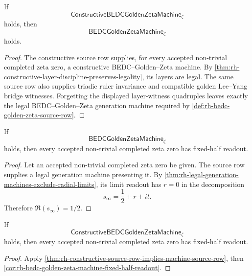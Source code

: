 \begin{theorem}
\label{thm:rh-constructive-source-row-implies-machine-source-row}
If
$$
\mathsf{ConstructiveBEDCGoldenZetaMachine}_{\zeta}
$$
holds, then
$$
\mathsf{BEDCGoldenZetaMachine}_{\zeta}
$$
holds.
\end{theorem}

\begin{proof}
The constructive source row supplies, for every accepted non-trivial
completed zeta zero, a constructive BEDC--Golden--Zeta machine.  By
\autoref{thm:rh-constructive-layer-discipline-preserves-legality}, its
layers are legal.  The same source row also supplies triadic ruler
invariance and compatible golden Lee--Yang bridge witnesses.  Forgetting
the displayed layer-witness quadruples leaves exactly the legal
BEDC--Golden--Zeta generation machine required by
\autoref{def:rh-bedc-golden-zeta-source-row}.
\end{proof}

\begin{corollary}
\label{cor:rh-bedc-golden-zeta-machine-fixed-half-readout}
If
$$
\mathsf{BEDCGoldenZetaMachine}_{\zeta}
$$
holds, then every accepted non-trivial completed zeta zero has fixed-half
readout.
\end{corollary}

\begin{proof}
Let an accepted non-trivial completed zeta zero be given.  The source
row supplies a legal generation machine presenting it.  By
\autoref{thm:rh-legal-generation-machines-exclude-radial-limits}, its
limit readout has $r=0$ in the decomposition
$$
s_{\infty}=\frac12+r+it.
$$
Therefore $\Re(s_{\infty})=1/2$.
\end{proof}

\begin{corollary}
\label{cor:rh-constructive-machine-source-row-fixed-half-readout}
If
$$
\mathsf{ConstructiveBEDCGoldenZetaMachine}_{\zeta}
$$
holds, then every accepted non-trivial completed zeta zero has fixed-half
readout.
\end{corollary}

\begin{proof}
Apply
\autoref{thm:rh-constructive-source-row-implies-machine-source-row}, then
\autoref{cor:rh-bedc-golden-zeta-machine-fixed-half-readout}.
\end{proof}

